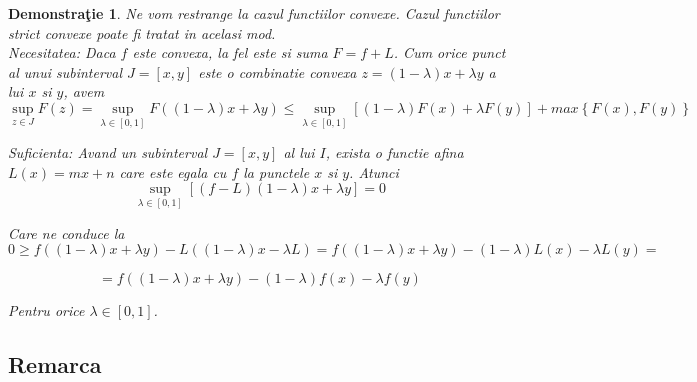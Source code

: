 \documentclass[a4paper,12pt,oneside]{report}
\newtheorem{demonstration}{Demonstra\c tie}
\begin{document}
\begin{demonstration}
Ne vom restrange la cazul functiilor convexe. Cazul functiilor strict convexe poate fi tratat in acelasi mod. 
\\ Necesitatea: Daca \(f\) este convexa, la fel este si suma \(F = f + L\). Cum orice punct al unui subinterval \(J = \left [ x , y \right ]\) este o combinatie convexa \(z = \left ( 1 - \lambda  \right )x + \lambda y \) a lui \(x\) si \(y\), avem
\begin{displaymath}
  \sup_{z\in J}F\left ( z \right ) = \sup_{\lambda \in \left [ 0 , 1 \right ]}F\left ( \left ( 1 - \lambda  \right )x + \lambda y \right )\leq \sup_{\lambda \in \left [ 0,1 \right ]}\left [ \left ( 1-\lambda  \right )F\left ( x \right ) + \lambda F\left ( y \right ) \right ] + max \left \{ F\left ( x \right ), F\left ( y \right ) \right \}
\end{displaymath}

Suficienta: Avand un subinterval \(J = \left [ x,y \right ]\) al lui \(I\), exista o functie afina \(L\left ( x \right ) = mx + n\) care este egala cu \(f\) la punctele  \(x\) si \(y\). 
Atunci
\begin{displaymath}
  \sup_{\lambda \in \left [ 0,1 \right ]}\left [ \left ( f - L \right )\left ( 1 - \lambda  \right )x + \lambda y \right ] = 0
\end{displaymath}

Care ne conduce la 
\begin{displaymath}
  0\geq f\left ( \left ( 1 - \lambda  \right )x + \lambda y \right )- L\left ( \left ( 1 - \lambda  \right )x - \lambda L \right )= f\left ( \left ( 1 - \lambda  \right )x + \lambda y  \right ) - \left ( 1 - \lambda  \right )L\left ( x \right ) - \lambda L\left ( y \right ) =
\end{displaymath}

\begin{displaymath}
  = f\left ( \left ( 1 - \lambda  \right )x + \lambda y \right ) - \left ( 1 - \lambda  \right ) f\left ( x \right ) - \lambda f \left ( y \right )
\end{displaymath}


Pentru orice \(\lambda \in \left [ 0,1 \right ]\). 

\end{demonstration}

\subsection{Remarca}
\end{document}
